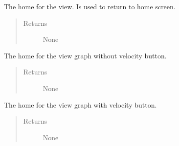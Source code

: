 \documentclass[letterpaper,10pt,english]{sphinxmanual}
\begin{document}
\begin{fulllineitems}
\begin{fulllineitems}
\begin{quote}
\begin{description}
\end{description}\end{quote}

\end{fulllineitems}


\begin{fulllineitems}
\label{\detokenize{index:src.Views.View_ReportScreen.ReportWindow.set_BtnHome}}
The home for the view. Is used to return to home screen.
\begin{quote}\begin{description}
\item[{Returns}] \leavevmode
None

\end{description}\end{quote}

\end{fulllineitems}


\begin{fulllineitems}
\label{\detokenize{index:src.Views.View_ReportScreen.ReportWindow.set_BtnViewGraphNoVelocity}}
The home for the view graph without velocity button.
\begin{quote}\begin{description}
\item[{Returns}] \leavevmode
None

\end{description}\end{quote}

\end{fulllineitems}


\begin{fulllineitems}
\label{\detokenize{index:src.Views.View_ReportScreen.ReportWindow.set_BtnViewGraphVelocity}}
The home for the view graph with velocity button.
\begin{quote}\begin{description}
\item[{Returns}] \leavevmode
None


\end{description}
\end{quote}
\end{fulllineitems}
\end{fulllineitems}
\end{document}
